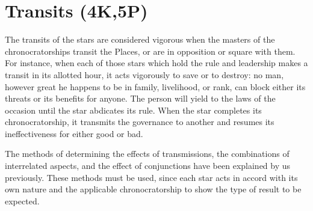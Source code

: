 \section{Transits (4K,5P)}

The transits of the stars are considered vigorous when the masters of the chronocratorships transit the Places, or are in opposition or square with them. For instance, when each of those stars which hold the rule and leadership makes a transit in its allotted hour, it acts vigorously to save or to destroy: no man, however great he happens to be in family, livelihood, or rank, can block either its threats or its benefits for anyone. The person will yield to the laws of the occasion until the star abdicates its rule. When the star completes its chronocratorship, it transmits the governance to another and resumes its ineffectiveness for either good or bad. 

The methods of determining the effects of transmissions, the combinations of interrelated aspects, and the effect of conjunctions have been explained by us previously. These methods must be used, since each star acts in accord with its own nature and the applicable chronocratorship to
show the type of result to be expected.

\newpage